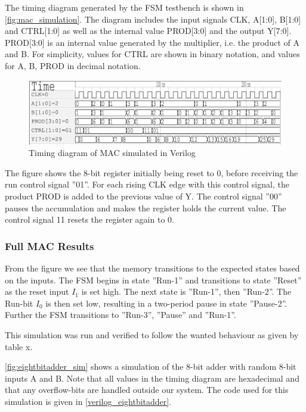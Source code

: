 The timing diagram generated by the FSM testbench is shown in \autoref{fig:mac_simulation}. The diagram includes the input signals CLK, A[1:0], B[1:0] and CTRL[1:0] as well as the internal value PROD[3:0] and the output Y[7:0]. PROD[3:0] is an internal value generated by the multiplier, i.e. the product of A and B. For simplicity,
values for CTRL are shown in binary notation, and values for A, B, PROD in decimal notation.

\begin{figure}[H]
    \centering
    \includegraphics[width=\textwidth]{Figures/Result MAC.png}
    \caption{Timing diagram of MAC simulated in Verilog}
    \label{fig:mac_simulation}
\end{figure}

The figure shows the 8-bit register initially being reset to 0, before receiving the run control signal ''01''. For each rising CLK edge with this control signal, the product PROD is added to the previous value of Y. The control signal ''00'' pauses the accumulation and makes the register holds the current value. The control signal 11 resets the register again to 0. 

\subsubsection{Full MAC Results}




From the figure we see that the memory transitions to the expected states based on the inputs. The FSM begins in state ''Run-1'' and transitions to state ''Reset'' as the reset input $I_1$ is set high. The next state is ''Run-1'', then ''Run-2''. The Run-bit $I_0$ is then set low, resulting in a two-period pause in state ''Pause-2''. Further the FSM transitions to ''Run-3'', ''Pause'' and ''Run-1''.

This simulation was run and verified to follow the wanted behaviour as given by table x.

\autoref{fig:eightbitadder_sim} shows a simulation of the 8-bit adder with random 8-bit inputs A and B. Note that all values in the timing diagram are hexadecimal and that any overflow-bits are handled outside our system. The code used for this simulation is given in \autoref{verilog_eightbitadder}.

